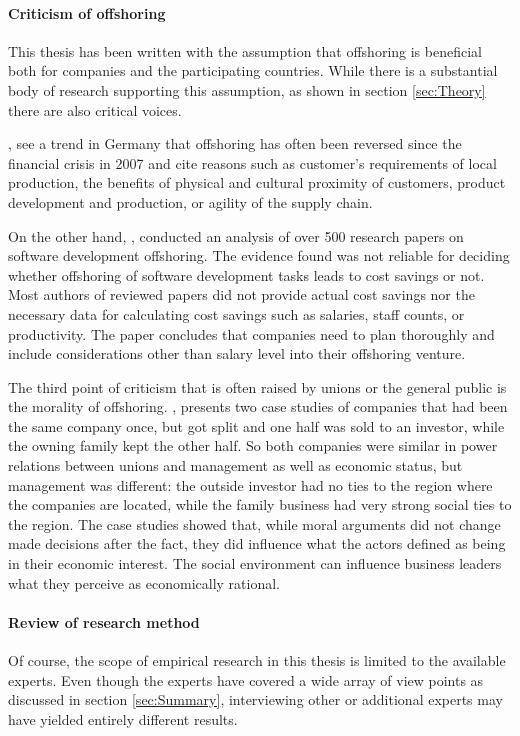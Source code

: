 \paragraph{Criticism of offshoring}
This thesis has been written with the assumption that offshoring is beneficial both for companies and the participating countries. While there is a substantial body of research supporting this assumption, as shown in section \ref{sec:Theory} there are also critical voices. 

\cite{Heim.2014}, see a trend in Germany that offshoring has often been reversed since the financial crisis in 2007 and cite reasons such as customer's requirements of local production, the benefits of physical and cultural proximity of customers, product development and production, or agility of the supply chain.

On the other hand, \cite{Smite.2015}, conducted an analysis of over 500 research papers on software development offshoring. The evidence found was not reliable for deciding whether offshoring of software development tasks leads to cost savings or not. Most authors of reviewed papers did not provide actual cost savings nor the necessary data for calculating cost savings such as salaries, staff counts, or productivity. The paper concludes that companies need to plan thoroughly and include considerations other than salary level into their offshoring venture. 

The third point of criticism that is often raised by unions or the general public is the morality of offshoring. \cite{Schroder.2013}, presents two case studies of companies that had been the same company once, but got split and one half was sold to an investor, while the owning family kept the other half. So both companies were similar in power relations between unions and management as well as economic status, but management was different: the outside investor had no ties to the region where the companies are located, while the family business had very strong social ties to the region. The case studies showed that, while moral arguments did not change made decisions after the fact, they did influence what the actors defined as being in their economic interest. The social environment can influence business leaders what they perceive as economically rational.


\paragraph{Review of research method}
Of course, the scope of empirical research in this thesis is limited to the available experts. Even though the experts have covered a wide array of view points as discussed in section \ref{sec:Summary}, interviewing other or additional experts may have yielded entirely different results.

